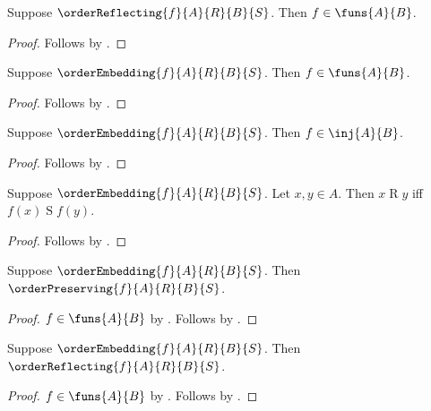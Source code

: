 \begin{proposition}\label{order_reflecting_type}
    Suppose $\orderReflecting{f}{A}{R}{B}{S}$.
    Then $f\in\funs{A}{B}$.
\end{proposition}
\begin{proof}
    Follows by .
\end{proof}

\begin{proposition}\label{order_embedding_type}
    Suppose $\orderEmbedding{f}{A}{R}{B}{S}$.
    Then $f\in\funs{A}{B}$.
\end{proposition}
\begin{proof}
    Follows by .
\end{proof}

\begin{proposition}\label{order_embedding_injective}
    Suppose $\orderEmbedding{f}{A}{R}{B}{S}$.
    Then $f\in\inj{A}{B}$.
\end{proposition}
\begin{proof}
    Follows by .
\end{proof}

\begin{proposition}\label{order_embedding_order_iff}
    Suppose $\orderEmbedding{f}{A}{R}{B}{S}$.
    Let $x,y\in A$.
    Then $x\mathrel{R}y$ iff $f(x)\mathrel{S}f(y)$.
\end{proposition}
\begin{proof}
    Follows by .
\end{proof}

\begin{proposition}\label{order_embedding_is_order_preserving}
    Suppose $\orderEmbedding{f}{A}{R}{B}{S}$.
    Then $\orderPreserving{f}{A}{R}{B}{S}$.
\end{proposition}
\begin{proof}
    $f\in\funs{A}{B}$ by .
    Follows by .
\end{proof}

\begin{proposition}\label{order_embedding_is_order_reflecting}
    Suppose $\orderEmbedding{f}{A}{R}{B}{S}$.
    Then $\orderReflecting{f}{A}{R}{B}{S}$.
\end{proposition}
\begin{proof}
    $f\in\funs{A}{B}$ by .
    Follows by .
\end{proof}

